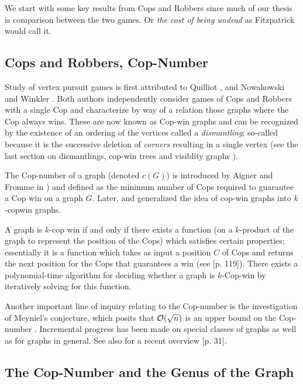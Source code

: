We start with some key results from Cops and Robbers since much of our thesis is comparison
between the two games. Or \textit{the cost of being undead} as Fitzpatrick \cite{fitzpatrick2016deterministic} would call it.

\subsection{Cops and Robbers, Cop-Number}

Study of vertex pursuit games is first attributed to Quilliot \cite{quilliot1978jeux, quilliot1983problemes}, and Nowakowski and Winkler \cite{nowakowski1983vertex}.
Both authors independently consider games of Cops and Robbers with a single Cop and characterize by way of a relation those graphs where the Cop always wins. These are now known as Cop-win graphs
and can be recognized by the existence of an ordering of the vertices called a \textit{dismantling};
so-called because it is the successive deletion of \textit{corners} resulting in a single vertex
(see the last section on dismantlings, cop-win trees and visiblity graphs ).

The Cop-number of a graph (denoted $c(G)$) is introduced by Aigner and Fromme in \cite{aigner1984game}) and defined as the minimum number of Cops required
to guarantee a Cop win on a graph $G$. Later, \cite{berarducci1993cop} and \cite{hahn2003characterisation} generalized the idea of cop-win graphs
into $k$-copwin graphs.

A graph is $k$-cop win if and only if there exists a function (on a $k$-product of the graph to represent the position of the Cops)
which satisfies certain properties; essentially it is a function which takes as input a position $C$ of Cops and returns the next position for the Cops that guarantees a win (see \cite{bonato2011game}[p. 119]).
There exists a polynomial-time algorithm for deciding whether a graph is $k$-Cop-win by iteratively
solving for this function.

Another important line of inquiry relating to the Cop-number is the investigation of Meyniel's conjecture, which posits that $\mathcal{O}(\sqrt{n})$ is an upper bound on the Cop-number \cite{frankl1987cops}.
Incremental progress has been made on special classes of graphs as well as for graphs in general. See also for a recent
overview \cite{gera2016graph}[p. 31].

\subsection{The Cop-Number and the Genus of the Graph}

